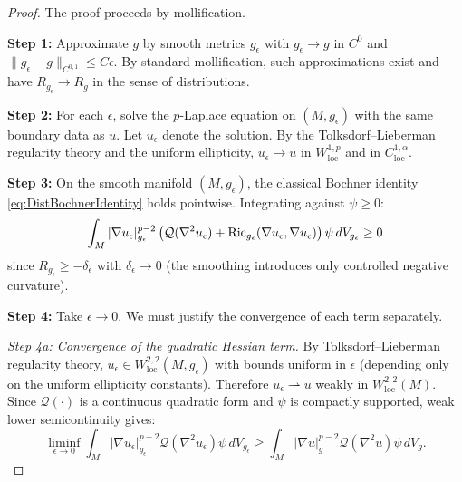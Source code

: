 \begin{proof}
The proof proceeds by mollification. 

\textbf{Step 1:} Approximate $g$ by smooth metrics $g_\epsilon$ with $g_\epsilon \to g$ in $C^0$ and $\|g_\epsilon - g\|_{C^{0,1}} \le C\epsilon$. By standard mollification, such approximations exist and have $R_{g_\epsilon} \to R_g$ in the sense of distributions.

\textbf{Step 2:} For each $\epsilon$, solve the $p$-Laplace equation on $(M, g_\epsilon)$ with the same boundary data as $u$. Let $u_\epsilon$ denote the solution. By the Tolksdorf--Lieberman regularity theory and the uniform ellipticity, $u_\epsilon \to u$ in $W^{1,p}_{\mathrm{loc}}$ and in $C^{1,\alpha}_{\mathrm{loc}}$.

\textbf{Step 3:} On the smooth manifold $(M, g_\epsilon)$, the classical Bochner identity \eqref{eq:DistBochnerIdentity} holds pointwise. Integrating against $\psi \ge 0$:
\begin{equation}
    \int_M |\nabla u_\epsilon|^{p-2}_{g_\epsilon} \left(\mathcal{Q}(\nabla^2 u_\epsilon) + \mathrm{Ric}_{g_\epsilon}(\nabla u_\epsilon, \nabla u_\epsilon)\right) \psi \, dV_{g_\epsilon} \ge 0
\end{equation}
since $R_{g_\epsilon} \ge -\delta_\epsilon$ with $\delta_\epsilon \to 0$ (the smoothing introduces only controlled negative curvature).

\textbf{Step 4:} Take $\epsilon \to 0$. We must justify the convergence of each term separately.

\textit{Step 4a: Convergence of the quadratic Hessian term.}
By Tolksdorf--Lieberman regularity theory, $u_\epsilon \in W^{2,2}_{\mathrm{loc}}(M, g_\epsilon)$ with bounds uniform in $\epsilon$ (depending only on the uniform ellipticity constants). Therefore $u_\epsilon \rightharpoonup u$ weakly in $W^{2,2}_{\mathrm{loc}}(M)$. Since $\mathcal{Q}(\cdot)$ is a continuous quadratic form and $\psi$ is compactly supported, weak lower semicontinuity gives:
\begin{equation}
    \liminf_{\epsilon \to 0} \int_M |\nabla u_\epsilon|^{p-2}_{g_\epsilon} \mathcal{Q}(\nabla^2 u_\epsilon) \psi \, dV_{g_\epsilon} \ge \int_M |\nabla u|^{p-2}_g \mathcal{Q}(\nabla^2 u) \psi \, dV_g.
\end{equation}


\end{proof}
